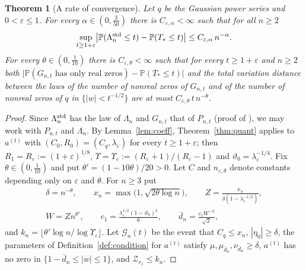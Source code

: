 \documentclass[11pt]{amsart}
\newtheorem{theorem}{Theorem}[section]
\theoremstyle{definition}
\theoremstyle{remark}
\numberwithin{equation}{section}
\newcommand{\PP}{\mathbb{P}}
\newcommand{\eps}{\varepsilon}
\begin{document}
\begin{theorem}[A rate of convergence]\label{thm:rate}
Let $q$ be the Gaussian power series and $0<\eps\le1$. For every $\alpha\in(0,\frac3{50})$ there is $C_{\eps,\alpha}<\infty$ such that for all $n\ge2$
\[
\sup_{t\ge1+\eps}\bigl|\PP(\Lambda_n^{\rm std}\le t)-\PP(T_*\le t)\bigr|\le C_{\eps,\alpha}\,n^{-\alpha}.
\]
For every $\theta\in(0,\frac1{10})$ there is $C_{\eps,\theta}<\infty$ such that for every $t\ge1+\eps$ and $n\ge2$ both $\bigl|\PP(G_{n,t}\text{ has only real zeros})-\PP(T_*\le t)\bigr|$ and the total variation distance between the laws of the number of nonreal zeros of $G_{n,t}$ and of the number of nonreal zeros of $q$ in $\{|w|<t^{-1/2}\}$ are at most $C_{\eps,\theta}\,t\,n^{-\theta}$.
\end{theorem}

\begin{proof}
Since $\Lambda_n^{\rm std}$ has the law of $\Lambda_n$ and $G_{n,t}$ that of $P_{n,t}$ (proof of \cite[Theorem~\ref{M-cor:weyl}]{Main}), we may work with $P_{n,t}$ and $\Lambda_n$. By Lemma~\ref{lem:coeff}, Theorem~\ref{thm:quant} applies to $a^{(t)}$ with $(C_0,R_0)=(C_q,\lambda_\eps)$ for every $t\ge1+\eps$; then $R_1=R_\eps:=(1+\eps)^{1/8}$, $\Upsilon=\Upsilon_\eps:=(R_\eps+1)/(R_\eps-1)$ and $\vartheta_0=\lambda_\eps^{-1/4}$. Fix $\theta\in(0,\frac1{10})$ and put $\theta'=(1-10\theta)/20>0$. Let $C$ and $n_{\eps,\theta}$ denote constants depending only on $\eps$ and $\theta$. For $n\ge3$ put
\begin{gather*}
\delta=n^{-\theta},\qquad x_n=\max\bigl(1,\sqrt{2\theta\log n}\bigr),\qquad Z=\frac{x_n}{\delta(1-\lambda_\eps^{-1/2})},\\
W=Zn^{\theta'},\qquad c_1=\frac{\lambda_\eps^{1/2}(1-\vartheta_0)^2}6,\qquad\bar d_n=\frac{c_1W^{-2}}{\sqrt2},
\end{gather*}
and $k_n=\lfloor\theta'\log n/\log\Upsilon_\eps\rfloor$. Let $\mathcal G_n(t)$ be the event that $C_q\le x_n$, $|\eta_0|\ge\delta$, the parameters of Definition~\ref{def:condition} for $a^{(t)}$ satisfy $\mu,\mu_{\bar d_n},\nu_{\bar d_n}\ge\delta$, $a^{(t)}$ has no zero in $\{1-\bar d_n\le|w|\le1\}$, and $\mathcal Z_{r_1}\le k_n$.


\end{proof}
\end{document}
